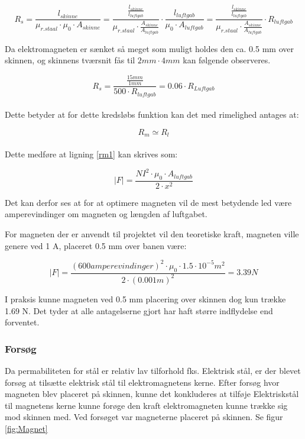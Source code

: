 \begin{equation}
R_s =  \frac{l_{skinne}}{\mu_{r.staal} \cdot \mu_0 \cdot A_{skinne} }
=
\frac{
	\frac{l_{skinne}}{l_{luftgab}} }{\mu_{r.staal} \cdot \frac{A_{skinne}}{A_{luftgab}} }\cdot \frac{l_{luftgab}}{\mu_0 \cdot A_{luftgab}}=\frac{
	\frac{l_{skinne}}{l_{luftgab}} }
	{\mu_{r.staal}\cdot\frac{A_{skinne}}{A_{luftgab}}}\cdot R_{luftgab}
\end{equation}


Da elektromagneten er sænket så meget som muligt holdes den ca. 0.5 mm over skinnen, og skinnens tværsnit fås til $2mm \cdot 4mm$ kan følgende observeres.

\begin{equation}
R_s =
\frac{\frac{15 mm}{1 mm} }
{ 500 \cdot R_{luftgab} }= 0.06\cdot R_{Luftgab}
	\end{equation}
\\
Dette betyder at for dette kredsløbs funktion kan det med rimelighed antages at:

\begin{equation}
R_m \simeq R_l
	\end{equation}
\\
Dette medføre at ligning \ref{rm1} kan skrives som:

\begin{equation}
\mid F \mid = \frac{NI^{2} \cdot \mu_0 \cdot A_{luftgab} } {2 \cdot x^2}
\end{equation}

Det kan derfor ses at for at optimere magneten vil de mest betydende led være amperevindinger om magneten og længden af luftgabet.

For magneten der er anvendt til projektet vil den teoretiske kraft, magneten ville genere ved 1 A, placeret 0.5 mm over banen være: %

\begin{equation}
\mid F \mid = \frac{(600 amperevindinger)^{2} \cdot \mu_0 \cdot 1.5 \cdot 10^{-5} m^2 } {2 \cdot (0.001m)^2} = 3.39 N
\end{equation}

I praksis kunne magneten ved 0.5 mm placering over skinnen dog kun trække  1.69 N. Det tyder at alle antagelserne gjort har haft større indflydelse end forventet.

\subsubsection{Forsøg}
Da permabiliteten for stål er relativ lav tilforhold fks. Elektrisk stål, er der blevet forsøg at tilsætte elektrisk stål til elektromagnetens kerne. Efter forsøg hvor magneten blev placeret på skinnen, kunne det konkluderes at tilføje Elektriskstål til magnetens kerne kunne forøge den kraft elektromagneten kunne trække sig mod skinnen med.
Ved forsøget var magneterne placeret på skinnen. Se figur \ref{fig:Magnet}

